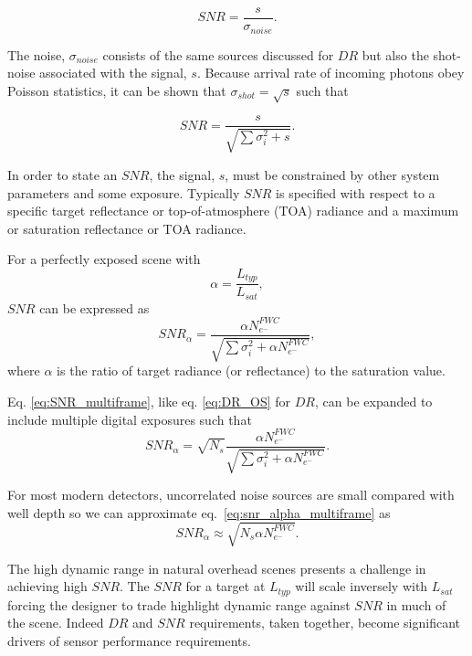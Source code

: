 \documentclass[10pt,journal]{IEEEtran}  %
\begin{document}
\begin{equation*}
    SNR = \frac{s}{\sigma_{noise}}.
\end{equation*}

The noise, $\sigma_{noise}$ consists of the same sources discussed for $DR$ but also the shot-noise associated with the signal, $s$.  Because arrival rate of incoming photons obey Poisson statistics, it can be shown that $\sigma_{shot} = \sqrt{s}$ such that

\begin{equation*}
    SNR = \frac{s}{\sqrt{\sum{\sigma_i^2} + s}}.
\end{equation*}

In order to state an $SNR$, the signal, $s$, must be constrained by other system parameters and some exposure.  Typically $SNR$ is specified with respect to a specific target reflectance or top-of-atmosphere (TOA) radiance and a maximum or saturation reflectance or TOA radiance.  

For a perfectly exposed scene with
\begin{equation}
    \alpha = \frac{L_{typ}}{L_{sat}},
\end{equation}
${SNR}$ can be expressed as
\begin{equation}
    SNR_{\alpha} = \frac{\alpha N_{e^-}^{FWC}}{\sqrt{\sum{\sigma_i^2} + \alpha N_{e^-}^{FWC}}},
\label{eq:SNR_multiframe}
\end{equation}
where $\alpha$ is the ratio of target radiance (or reflectance) to the saturation value.

Eq. \eqref{eq:SNR_multiframe}, like eq. \eqref{eq:DR_OS} for $DR$, can be expanded to include multiple digital exposures such that
\begin{equation}
\label{eq:snr_alpha_multiframe}
SNR_{\alpha} = \sqrt{N_s}\frac{\alpha N_{e^-}^{FWC}}{\sqrt{\sum{\sigma_i^2} + \alpha N_{e^-}^{FWC}}}.
\end{equation}

For most modern detectors, uncorrelated noise sources are small compared with well depth so we can approximate eq.~\eqref{eq:snr_alpha_multiframe} as
\begin{equation}
\label{eq:snr_alpha_multiframe_simp}
SNR_{\alpha} \approx \sqrt{N_s \alpha N_{e^-}^{FWC}}.
\end{equation}

The high dynamic range in natural overhead scenes presents a challenge in achieving high $SNR$.  The $SNR$ for a target at $L_{typ}$ will scale inversely with $L_{sat}$ forcing the designer to trade highlight dynamic range against $SNR$ in much of the scene.  Indeed $DR$ and $SNR$ requirements, taken together, become significant drivers of sensor performance requirements.
\end{document}
